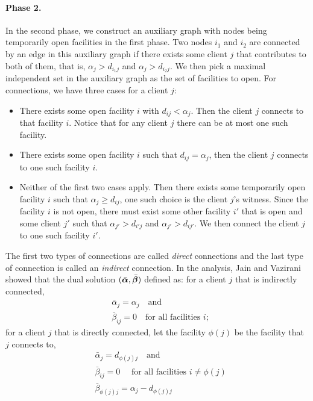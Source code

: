 \documentclass[oneside,final]{ucr}
\begin{document}
\paragraph{Phase 2.} In the second phase, we construct an
auxiliary graph with nodes being temporarily open facilities
in the first phase. Two nodes $i_1$ and $i_2$ are connected
by an edge in this auxiliary graph if there exists some
client $j$ that contributes to both of them, that is,
$\alpha_j > d_{i_1 j}$ and $\alpha_j > d_{i_2 j}$. We then
pick a maximal independent set in the auxiliary graph as the
set of facilities to open. For connections, we have three
cases for a client $j$:
\begin{itemize}
\item There exists some open facility $i$ with $d_{ij} <
  \alpha_j$. Then the client $j$ connects to that facility
  $i$. Notice that for any client $j$ there can be at most
  one such facility.
\item There exists some open facility $i$ such that $d_{ij}
  = \alpha_j$, then the client $j$ connects to one such
  facility $i$.
\item Neither of the first two cases apply. Then there
  exists some temporarily open facility $i$ such that
  $\alpha_j \geq d_{ij}$, one such choice is the client
  $j$'s witness. Since the facility $i$ is not open, there
  must exist some other facility $i'$ that is open and some
  client $j'$ such that $\alpha_{j'} > d_{i'j}$ and
  $\alpha_{j'} > d_{i j'}$. We then connect the client $j$
  to one such facility $i'$.
\end{itemize}
The first two types of connections are called \emph{direct}
connections and the last type of connection is called an
\emph{indirect} connection. In the analysis, Jain and
Vazirani showed that the dual solution
$(\bar{\boldsymbol{\alpha}},\bar{\boldsymbol{\beta}})$ defined as: for a client $j$
that is indirectly connected,
\begin{align*}
  &\bar\alpha_j = \alpha_j \quad \text{and}\\
  &\bar\beta_{ij} = 0 \quad\text{for all facilities } i;
\end{align*}
for a client $j$ that is directly connected, let the
facility $\phi(j)$ be the facility that $j$ connects to,
\begin{align*}
  &\bar\alpha_j = d_{\phi(j)j} \quad \text{and}\\
  &\bar\beta_{ij} = 0 \quad\text{ for all facilities } i \neq
  \phi(j)\\
  &\bar\beta_{\phi(j)j} = \alpha_j - d_{\phi(j)j}
\end{align*}
\end{document}
